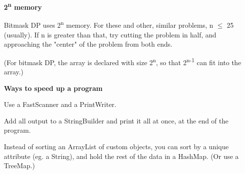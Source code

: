 \textbf{2\textsuperscript{n} memory}

Bitmask DP uses 2\textsuperscript{n} memory. For these and other, similar problems, n $\leq$ 25 (usually). If n is greater than that, try cutting the problem in half, and approaching the "center" of the problem from both ends.

(For bitmask DP, the array is declared with size 2\textsuperscript{n}, so that 2\textsuperscript{n-1} can fit into the array.)

\textbf{Ways to speed up a program}

Use a FastScanner and a PrintWriter.

Add all output to a StringBuilder and print it all at once, at the end of the program.

Instead of sorting an ArrayList of custom objects, you can sort by a unique attribute (eg. a String), and hold the rest of the data in a HashMap. (Or use a TreeMap.)

\newpage